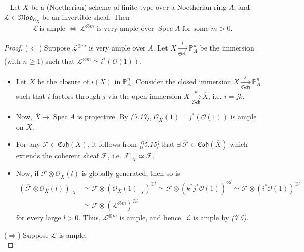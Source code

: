 \documentclass[11pt,a4paper,footinclude=true,headinclude=true]{scrbook} %
\DeclareMathOperator{\Spec}{Spec}
\newcommand{\FF}{\mathscr{F}}
\newcommand{\LL}{\mathscr{L}}
\newcommand{\OO}{\mathcal{O}}
\newcommand{\PP}{\mathbb{P}}
\newcommand{\Sch}{\mathfrak{Sch}}
\newcommand{\<}{\langle}
\newcommand{\>}{\rangle}
\newcommand{\MOD}{\mathfrak{Mod}}
\newcommand{\coh}{\mathfrak{Coh}}
\newenvironment{theorem}[2][]
{\renewcommand\theinnercustomthm{#2}\innercustomthm[#1]
\begin{mdframed}[backgroundcolor=yellow!20]\ }
{\end{mdframed}\endinnercustomthm}
\begin{document}
\begin{theorem}{7.6}
    Let $X$ be a (Noetherian) scheme of finite type over a Noetherian ring $A$, and $\LL\in\MOD_{\OO_X}$ be an invertible sheaf. Then
    \begin{align*}
        \LL\ \text{is ample $\Longleftrightarrow\ \LL^{\otimes m}$ is very ample over $\Spec A$ for some $m>0$}.
    \end{align*}
\end{theorem}
\begin{proof}
    ($\Leftarrow$) Suppose $\LL^{\otimes m}$ is very ample over $A$. Let $X\xrightarrow[\Sch]{i}\PP_A^n$ be the immersion (with $n\geq1$) such that $\LL^{\otimes m}\simeq i^\ast(\OO(1))$. 
    \begin{itemize}
        \item Let $\overline{X}$ be the closure of $i(X)$ in $\PP_A^n$. Consider the closed immersion $\overline{X}\xrightarrow[\Sch]{j}\PP_A^n$ such that $i$ factors through $j$ via the open immersion $X\xrightarrow[\Sch]{k}\overline{X}$, i.e. $i=jk$. 
        \item Now, $\overline{X}\to\Spec A$ is projective. By \textit{(5.17)}, $\OO_{\overline{X}}(1)=j^\ast(\OO(1))$ is ample on $\overline{X}$.
        \item For any $\FF\in\coh(X)$, it follows from \textit{[]5.15]} that $\exists\ \overline{\FF}\in\coh(\overline{X})$ which extends the coherent sheaf $\FF$, i.e. $\overline{\FF}|_X\simeq\FF$.
        \item Now, if $\overline{\FF}\otimes\OO_{\overline{X}}(l)$ is globally generated, then so is
        \begin{align*}
            (\overline{\FF}\otimes\OO_{\overline{X}}(l))|_X &\simeq\FF\otimes(\OO_{\overline{X}}(1)|_X)^{\otimes l}\simeq\FF\otimes(k^\ast j^\ast\OO(1))^{\otimes l}\simeq\FF\otimes(i^\ast\OO(1))^{\otimes l}\\ &\simeq\FF\otimes(\LL^{\otimes m})^{\otimes l}
        \end{align*}
        for every large $l>0$. Thus, $\LL^{\otimes m}$ is ample, and hence, $\LL$ is ample by \textit{(7.5)}.
    \end{itemize}
    
    ($\Rightarrow$) Suppose $\LL$ is ample.\\
    

\end{proof}
\end{document}

